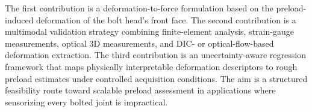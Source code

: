 The first contribution is a deformation-to-force formulation based on the preload-induced deformation of the bolt head's front face. The second contribution is a multimodal validation strategy combining finite-element analysis, strain-gauge measurements, optical 3D measurements, and DIC- or optical-flow-based deformation extraction. The third contribution is an uncertainty-aware regression framework that maps physically interpretable deformation descriptors to rough preload estimates under controlled acquisition conditions. The aim is a structured feasibility route toward scalable preload assessment in applications where sensorizing every bolted joint is impractical.

